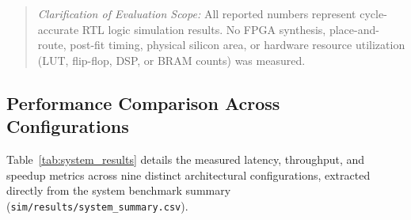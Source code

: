 \documentclass[conference]{IEEEtran}
\begin{document}
\begin{quote}
\textit{Clarification of Evaluation Scope:} All reported numbers represent cycle-accurate RTL logic simulation results. No FPGA synthesis, place-and-route, post-fit timing, physical silicon area, or hardware resource utilization (LUT, flip-flop, DSP, or BRAM counts) was measured.
\end{quote}

\subsection{Performance Comparison Across Configurations}
Table~\ref{tab:system_results} details the measured latency, throughput, and speedup metrics across nine distinct architectural configurations, extracted directly from the system benchmark summary (\texttt{sim/results/system\_summary.csv}).
\end{document}
